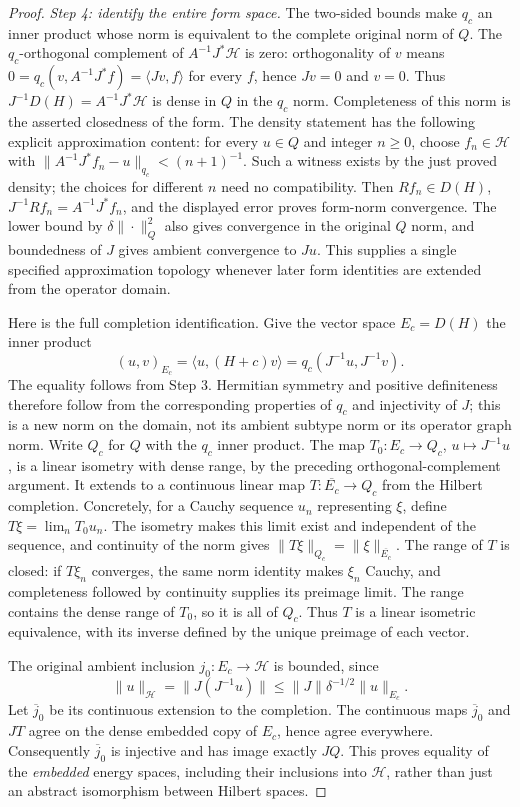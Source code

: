 \documentclass[11pt,a4paper]{article}
\theoremstyle{definition}
\theoremstyle{remark}
\begin{document}
\begin{proof}
\emph{Step 4: identify the entire form space.}
The two-sided bounds make $q_c$ an inner product whose norm is
equivalent to the complete original norm of $Q$. The
$q_c$-orthogonal complement of $A^{-1}J^*\mathcal H$ is zero:
orthogonality of $v$ means
$0=q_c(v,A^{-1}J^*f)=\langle Jv,f\rangle$ for every $f$, hence
$Jv=0$ and $v=0$. Thus
$J^{-1}D(H)=A^{-1}J^*\mathcal H$ is dense in $Q$ in the $q_c$
norm. Completeness of this norm is the asserted closedness of the form.
The density statement has the following explicit approximation
content: for every $u\in Q$ and integer $n\geq0$, choose
$f_n\in\mathcal H$ with
$\|A^{-1}J^*f_n-u\|_{q_c}<(n+1)^{-1}$.
Such a witness exists by the just proved density; the choices for
different $n$ need no compatibility. Then $Rf_n\in D(H)$,
$J^{-1}Rf_n=A^{-1}J^*f_n$, and the displayed error proves
form-norm convergence. The lower bound by $\delta\|\cdot\|_Q^2$
also gives convergence in the original $Q$ norm, and boundedness
of $J$ gives ambient convergence to $Ju$. This supplies a single
specified approximation topology whenever later form identities are
extended from the operator domain.

Here is the full completion identification. Give the vector space
$E_c=D(H)$ the inner product
\[
 (u,v)_{E_c}=\langle u,(H+c)v\rangle
            =q_c(J^{-1}u,J^{-1}v).
\]
The equality follows from Step 3. Hermitian symmetry and positive
definiteness therefore follow from the corresponding properties of
$q_c$ and injectivity of $J$; this is a new norm on the domain, not
its ambient subtype norm or its operator graph norm. Write $Q_c$
for $Q$ with the $q_c$ inner product. The map
$T_0:E_c\to Q_c$, $u\mapsto J^{-1}u$, is a linear isometry
with dense range, by the preceding orthogonal-complement argument.
It extends to a continuous linear map
$T:\overline{E_c}\to Q_c$ from the Hilbert completion.
Concretely, for a Cauchy sequence $u_n$ representing $\xi$, define
$T\xi=\lim_nT_0u_n$. The isometry makes this limit exist and
independent of the sequence, and continuity of the norm gives
$\|T\xi\|_{Q_c}=\|\xi\|_{\overline{E_c}}$.
The range of $T$ is closed: if $T\xi_n$ converges, the same norm
identity makes $\xi_n$ Cauchy, and completeness followed by
continuity supplies its preimage limit. The range contains the
dense range of $T_0$, so it is all of $Q_c$. Thus $T$ is a
linear isometric equivalence, with its inverse defined by the
unique preimage of each vector.

The original ambient inclusion $j_0:E_c\to\mathcal H$ is bounded,
since
\[
 \|u\|_{\mathcal H}
 =\|J(J^{-1}u)\|\leq\|J\|\delta^{-1/2}\|u\|_{E_c}.
\]
Let $\overline j_0$ be its continuous extension to the completion.
The continuous maps $\overline j_0$ and $JT$ agree on the dense
embedded copy of $E_c$, hence agree everywhere. Consequently
$\overline j_0$ is injective and has image exactly $JQ$.
This proves equality of the \emph{embedded} energy spaces, including
their inclusions into $\mathcal H$, rather than just an abstract
isomorphism between Hilbert spaces.


\end{proof}
\end{document}
